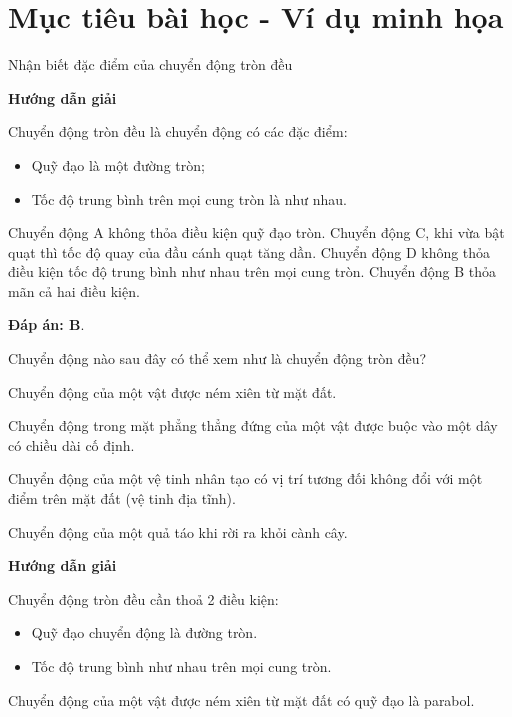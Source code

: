 \section{Mục tiêu bài học - Ví dụ minh họa}
\begin{dang}{Nhận biết đặc điểm của  chuyển động tròn đều}
	{	\begin{center}
			\textbf{Hướng dẫn giải}
		\end{center}
		
		Chuyển động tròn đều là chuyển động có các đặc điểm:
		\begin{itemize}
			\item Quỹ đạo là một đường tròn;
			\item Tốc độ trung bình trên mọi cung tròn là như nhau.
		\end{itemize}
		Chuyển động A không thỏa điều kiện quỹ đạo tròn. Chuyển động C, khi vừa bật quạt thì tốc độ quay của đầu cánh quạt tăng dần. Chuyển động D không thỏa điều kiện tốc độ trung bình như nhau trên mọi cung tròn. Chuyển động B thỏa mãn cả hai điều kiện. 
		
		\textbf{Đáp án: B}.
		
	}
	{Chuyển động nào sau đây có thể xem như là chuyển động tròn đều?
	\begin{mcq}
		\item Chuyển động của một vật được ném xiên từ mặt đất.
		\item Chuyển động trong mặt phẳng thẳng đứng của một vật được buộc vào một dây có chiều dài cố định.
		\item Chuyển động của một vệ tinh nhân tạo có vị trí tương đối không đổi với một điểm trên mặt đất (vệ tinh địa tĩnh).
		\item Chuyển động của một quả táo khi rời ra khỏi cành cây.
	\end{mcq}
}
{\begin{center}
		\textbf{Hướng dẫn giải}
	\end{center}
Chuyển động tròn đều cần thoả 2 điều kiện:
\begin{itemize}
	\item Quỹ đạo chuyển động là đường tròn.
	\item Tốc độ trung bình như nhau trên mọi cung tròn.
\end{itemize}
Chuyển động của một vật được ném xiên từ mặt đất có quỹ đạo là parabol.

}
\end{dang}
